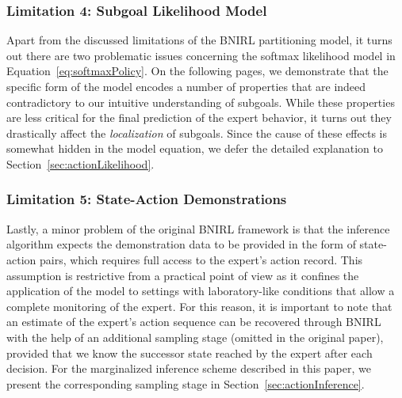 \documentclass[twoside,11pt]{article}
\begin{document}
\subsubsection*{Limitation 4: Subgoal Likelihood Model}
\label{phantom:lim4}
Apart from the discussed limitations of the BNIRL partitioning model, %
it turns out there are %
two problematic issues %
concerning the %
softmax %
likelihood model in Equation~\eqref{eq:softmaxPolicy}. %
%
%
%
On the following pages, we demonstrate that %
%
%
the specific form of the model encodes a number of properties that %
are indeed contradictory to our intuitive understanding of subgoals. While these properties %
are less critical for the final 
prediction of the expert behavior, %
it turns out they drastically affect %
the %
\textit{localization} of subgoals. Since the cause of these effects is somewhat hidden in the model equation, %
we defer the detailed explanation %
to %
Section~\ref{sec:actionLikelihood}.
%


\subsubsection*{Limitation 5: State-Action Demonstrations} 
\label{phantom:lim5}
Lastly, a minor problem of the original BNIRL %
framework 
is that the inference algorithm expects the demonstration data to be provided in the form of state-action pairs, which %
requires full access to the expert's action record.
This %
%
%
assumption is restrictive from a practical point of view as it %
%
confines the application of the model to settings with laboratory-like conditions that allow a complete monitoring of the expert. %
For this reason, it is important to note that an estimate of the expert's action sequence %
can be %
recovered through BNIRL with the help of an additional sampling stage (omitted in the original paper), %
%
%
%
%
%
provided that we know the %
successor state %
reached by the expert %
after each decision. %
%
For the marginalized %
inference scheme described in this paper, we present the corresponding sampling stage in Section~\ref{sec:actionInference}.



%
%
%
%
%
%
%
%
%
%
%
%
%
%
%
%



%
\end{document}
